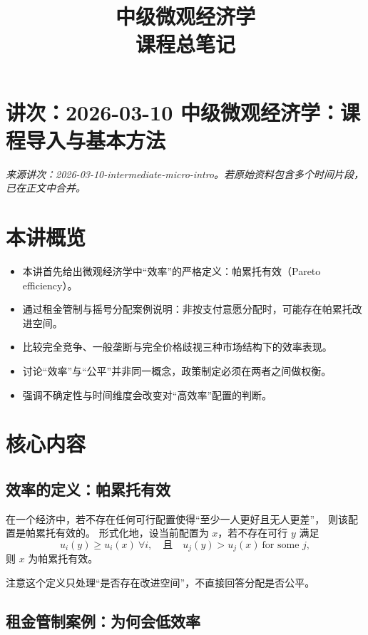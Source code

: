 \documentclass[UTF8,11pt,a4paper]{ctexart}
\title{ 中级微观经济学 \\ \large 课程总笔记 }
\author{}
\date{}
\begin{document}
\maketitle

\tableofcontents

\newpage

\section{讲次：2026-03-10 中级微观经济学：课程导入与基本方法}
\textit{来源讲次：2026-03-10-intermediate-micro-intro。若原始资料包含多个时间片段，已在正文中合并。}

\section{本讲概览}

\begin{itemize}
  \item 本讲首先给出微观经济学中“效率”的严格定义：帕累托有效（Pareto efficiency）。
  \item 通过租金管制与摇号分配案例说明：非按支付意愿分配时，可能存在帕累托改进空间。
  \item 比较完全竞争、一般垄断与完全价格歧视三种市场结构下的效率表现。
  \item 讨论“效率”与“公平”并非同一概念，政策制定必须在两者之间做权衡。
  \item 强调不确定性与时间维度会改变对“高效率”配置的判断。
\end{itemize}

\section{核心内容}

\subsection{效率的定义：帕累托有效}

在一个经济中，若不存在任何可行配置使得“至少一人更好且无人更差”，
则该配置是帕累托有效的。
形式化地，设当前配置为 $x$，若不存在可行 $y$ 满足
\begin{equation}
  u_i(y) \ge u_i(x) \ \forall i, \quad \text{且}\quad u_j(y) > u_j(x) \ \text{for some } j,
\end{equation}
则 $x$ 为帕累托有效。

注意这个定义只处理“是否存在改进空间”，不直接回答分配是否公平。

\subsection{租金管制案例：为何会低效率}
\end{document}
